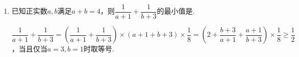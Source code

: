 \begin{enumerate}
\begin{enumerate}
        \begin{jieda}
            \begin{enumerate}
                \item $\dfrac{1}{x} + \dfrac{2}{y} = (\dfrac{1}{x} + \dfrac{2}{y}) \cdot (x+2y) \cdot \dfrac{1}{4} = \dfrac{1}{4} \cdot (1 + 4 + \dfrac{2x}{y} + \dfrac{2y}{x}) \geq \dfrac{1}{4}(5+2\sqrt{4}) = \dfrac{9}{4}$（当$x = y = \dfrac{4}{3}$时取得最小值）
                \item $\dfrac{1}{x+1} + \dfrac{2}{y+3} = (\dfrac{1}{x+1} + \dfrac{2}{y+3}) \cdot (x+1+2y+6)\cdot\dfrac{1}{11} = \dfrac{1}{11}(1 + 4 + \dfrac{2x+2}{y+3} + \dfrac{2y+6}{x+1}) \\
                \geq \dfrac{1}{11}(5 + 2\sqrt{4}) = \dfrac{9}{11}$（当$x = \dfrac{8}{3}, y = \dfrac{2}{3}$时取得最小值）
                \item 设$m(2x+y) + n(x+3y) = k(x+2y)$，故$2(2m+n) = m+3n$，即$3m = n$，故可取$m = 1, n = 3$ \\
                $\dfrac{1}{2x+y} + \dfrac{2}{x+3y} = \dfrac{1}{2x+y} + \dfrac{6}{3x+9y} = (\dfrac{1}{2x+y} + \dfrac{6}{3x+9y}) \cdot (2x+y + 3x+9y) \cdot \dfrac{1}{20} \\
                = \dfrac{1}{20}(1 + 6 + \dfrac{3x+9y}{2x+y} + \dfrac{6(2x+y)}{3x+9y}) \geq \dfrac{1}{20}(7 + 2\sqrt{6}) = \dfrac{7+2\sqrt{6}}{20}$（当$\dfrac{3x+9y}{2x+y} = \dfrac{6(2x+y)}{3x+9y}$时取等）\\
                \ps 体会“基”的思想：将分母看做一组“基”，线性组合表示限制条件，根据系数对目标式进行变形.
            \end{enumerate}
        \end{jieda}
        \item 已知正实数$a, b$满足$a+b = 4$，则$\dfrac{1}{a+1} + \dfrac{1}{b+3}$的最小值是.
        \begin{jieda}
            $\dfrac{1}{a+1} + \dfrac{1}{b+3} = (\dfrac{1}{a+1} + \dfrac{1}{b+3}) \times (a+1+b+3) \times \dfrac{1}{8} = (2+\dfrac{b+3}{a+1} + \dfrac{a+1}{b+3}) \times \dfrac{1}{8} \geq \dfrac{1}{2}$，当且仅当$a = 3, b = 1$时取等号.
        \end{jieda}

\end{enumerate}
\end{enumerate}
